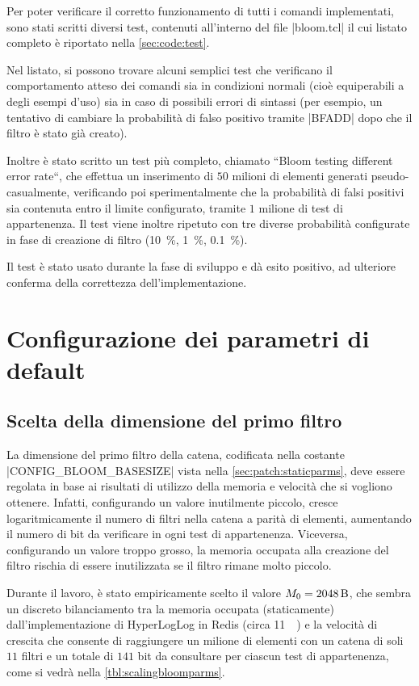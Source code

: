 Per poter verificare il corretto funzionamento di tutti i comandi implementati, sono stati
scritti diversi test, contenuti all'interno del file \cverb|bloom.tcl| il cui listato completo
è riportato nella \autoref{sec:code:test}. 

Nel listato, si possono trovare alcuni semplici test che verificano il comportamento atteso dei
comandi sia in condizioni normali (cioè equiperabili a degli esempi d'uso) sia in caso di possibili
errori di sintassi (per esempio, un tentativo di cambiare la probabilità di falso positivo tramite
\cverb|BFADD| dopo che il filtro è stato già creato).

Inoltre è stato scritto un test più completo, chiamato ``Bloom testing different error rate``,
che effettua un inserimento di $50$ milioni di elementi generati pseudo-casualmente, verificando poi
sperimentalmente che la probabilità di falsi positivi sia contenuta entro il limite configurato,
tramite $1$ milione di test di appartenenza. Il test viene inoltre ripetuto con tre diverse
probabilità configurate in fase di creazione di filtro (\SI{10}{\%}, \SI{1}{\%}, \SI{0.1}{\%}). 

Il test è stato usato durante la fase di sviluppo e dà esito positivo, ad ulteriore conferma della
correttezza dell'implementazione.

\section{Configurazione dei parametri di default}

\subsection{Scelta della dimensione del primo filtro}
\label{sec:patch:basesize}

La dimensione del primo filtro della catena, codificata nella costante \cverb|CONFIG_BLOOM_BASESIZE|
vista nella \autoref{sec:patch:staticparms}, deve essere regolata in base ai risultati di utilizzo
della memoria e velocità che si vogliono ottenere. Infatti, configurando un valore inutilmente
piccolo, cresce logaritmicamente il numero di filtri nella catena a parità di elementi, aumentando
il numero di bit da verificare in ogni test di appartenenza. Viceversa, configurando un valore
troppo grosso, la memoria occupata alla creazione del filtro rischia di essere inutilizzata se
il filtro rimane molto piccolo.

Durante il lavoro, è stato empiricamente scelto il valore $M_0 = \SI{2048}{\byte}$, che sembra un
discreto bilanciamento tra la memoria occupata (staticamente) dall'implementazione di HyperLogLog in
Redis (circa \SI{11}{\kibi\byte}) e la velocità di crescita che consente di raggiungere un milione
di elementi con un catena di soli $11$ filtri e un totale di $141$ bit da consultare per ciascun
test di appartenenza, come si vedrà nella \autoref{tbl:scalingbloomparms}.

